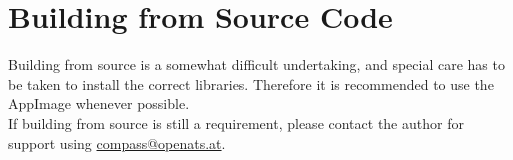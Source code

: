 \section{Building from Source Code}

Building from source is a somewhat difficult undertaking, and special care has to be taken to install the correct libraries. Therefore it is recommended to use the AppImage whenever possible. \\

If building from source is still a requirement, please contact the author for support using \href{mailto:compass@openats.at}{compass@openats.at}.





